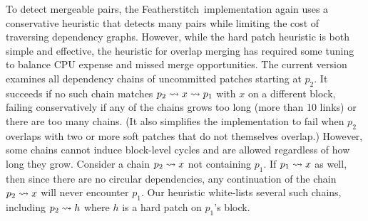 \documentclass[9pt,twocolumn,letterpaper]{article}
\newcommand{\Kudos}{Featherstitch}
\begin{document}
To detect mergeable pairs, the \Kudos\ implementation again uses a
conservative heuristic that detects many pairs while limiting the
cost of traversing dependency graphs.
%
However, while the hard patch heuristic is both simple and effective, the heuristic
for overlap merging has required some tuning to balance CPU expense and
missed merge opportunities.
%
The current version examines all dependency chains of uncommitted patches
starting at $p_2$.  It succeeds if no such chain matches $p_2 \leadsto x
\leadsto p_1$ with $x$ on a different block,
failing conservatively if any of the chains grows too long (more than 10
links) or there are too many chains.  
%
(It also simplifies the implementation to fail when $p_2$
overlaps with two or more soft patches that do not themselves overlap.)
%
However, some chains cannot induce block-level cycles and are allowed
regardless of how long they grow.
%
Consider a chain $p_2 \leadsto x$ not containing $p_1$.
%
If $p_1 \leadsto x$ as well, then since there are no circular dependencies, 
any continuation of the chain $p_2 \leadsto x$ will never encounter $p_1$.
%
Our heuristic white-lists several such chains, including $p_2 \leadsto h$
where $h$ is a hard patch on $p_1$'s block.
%
%
\end{document}
